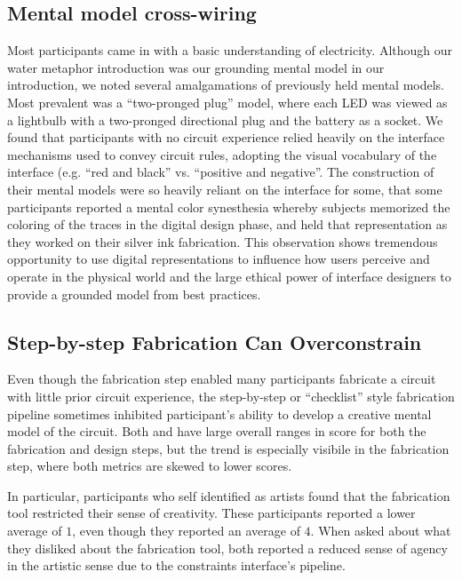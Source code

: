 \documentclass{sigchi}
\begin{document}
  \subsection{Mental model cross-wiring}
  Most participants came in with a basic understanding of electricity. Although our water metaphor introduction was our grounding mental model in our introduction, we noted several amalgamations of previously held mental models. Most prevalent was a ``two-pronged plug'' model, where each LED was viewed as a lightbulb with a two-pronged directional plug and the battery as a socket. We found that participants with no circuit experience relied heavily on the interface mechanisms used to convey circuit rules, adopting the visual vocabulary of the interface (e.g. ``red and black'' vs. ``positive and negative''. The construction of their mental models were so heavily reliant on the interface for some, that some participants reported a mental color synesthesia whereby subjects memorized the coloring of the traces in the digital design phase, and held that representation as they worked on their silver ink fabrication. This observation shows tremendous opportunity to use digital representations to influence how users perceive and operate in the physical world and the large ethical power of interface designers to provide a grounded model from best practices. 


  \subsection{Step-by-step Fabrication Can Overconstrain}

  Even though the fabrication step enabled many participants fabricate a circuit with little prior circuit experience, the step-by-step or ``checklist'' style fabrication pipeline sometimes inhibited participant's ability to develop a creative mental model of the circuit. Both  and  have large overall ranges in score for both the fabrication and design steps, but the trend is especially visibile in the fabrication step, where both  metrics are skewed to lower scores.
  
  In particular, participants who self identified as artists found that the fabrication tool restricted their sense of creativity. These participants reported a lower average  of $1$, even though they reported an average  of $4$. When asked about what they disliked about the fabrication tool, both reported a reduced sense of agency in the artistic sense due to the constraints interface's pipeline.
\end{document}

